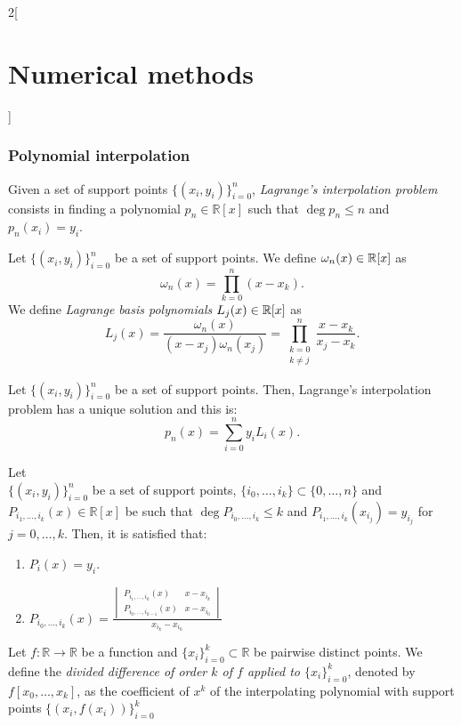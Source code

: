 \documentclass[../../../main.tex]{subfiles}
\begin{document}
\begin{multicols}{2}[\section{Numerical methods}]
\subsubsection*{Polynomial interpolation}
\begin{definition}
    Given a set of support points $\{(x_i,y_i)\}_{i=0}^n$, \textit{Lagrange's interpolation problem} consists in finding a polynomial $p_n\in\mathbb{R}[x]$ such that $\deg p_n\leq n$ and $p_n(x_i)=y_i$.
\end{definition}
\begin{definition}
    Let $\{(x_i,y_i)\}_{i=0}^n$ be a set of support points. We define $\omega_n(x)\in\mathbb{R}[x]$ as $$\omega_n(x)=\prod_{k=0}^n(x-x_k).$$ We define \textit{Lagrange basis polynomials} $L_j(x)\in\mathbb{R}[x]$ as $$L_j(x)=\frac{\omega_n(x)}{(x-x_j)\omega_n(x_j)}=\prod_{\substack{k=0\\k\ne j}}^n\frac{x-x_k}{x_j-x_k}.$$
\end{definition}
\begin{prop}
    Let $\{(x_i,y_i)\}_{i=0}^n$ be a set of support points. Then, Lagrange's interpolation problem has a unique solution and this is: $$p_n(x)=\sum_{i=0}^ny_iL_i(x).$$
\end{prop}
\begin{prop}
    Let \\$\{(x_i,y_i)\}_{i=0}^n$ be a set of support points, $\{i_0,\ldots,i_k\}\subset\{0,\ldots,n\}$ and $P_{i_1,\ldots,i_k}(x)\in\mathbb{R}[x]$ be such that $\deg P_{i_0,\ldots,i_k}\leq k$ and $P_{i_1,\ldots,i_k}(x_{i_j})=y_{i_j}$ for $j=0,\ldots,k$. Then, it is satisfied that:
    \begin{enumerate}
        \item $P_i(x)=y_i$.
        \item $P_{i_0,\ldots,i_k}(x)=\frac{\begin{vmatrix}
        P_{i_1,\ldots,i_k}(x) & x-x_{i_k}\\
        P_{i_0,\ldots,i_{k-1}}(x) & x-x_{i_0}
        \end{vmatrix}}{x_{i_k}-x_{i_0}}$
    \end{enumerate}
\end{prop}
\begin{definition}
    Let $f:\mathbb{R}\rightarrow\mathbb{R}$ be a function and $\{x_i\}_{i=0}^k\subset\mathbb{R}$ be pairwise distinct points. We define the \textit{divided difference of order $k$ of $f$ applied to $\{x_i\}_{i=0}^k$}, denoted by $f[x_0,\ldots,x_k]$, as the coefficient of $x^k$ of the interpolating polynomial with support points $\{(x_i,f(x_i))\}_{i=0}^k$ 

\end{definition}
\end{multicols}
\end{document}
